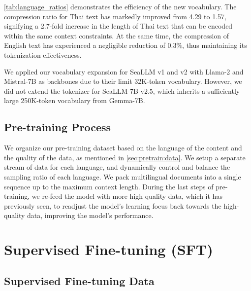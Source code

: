 \ref{tab:language_ratios} demonstrates the efficiency of the new vocabulary. The compression ratio for Thai text has markedly improved from 4.29 to 1.57, signifying a 2.7-fold increase in the length of Thai text that can be encoded within the same context constraints. At the same time, the compression of English text has experienced a negligible reduction of 0.3\%, thus maintaining its tokenization effectiveness.

We applied our vocabulary expansion for SeaLLM v1 and v2 with Llama-2 and Mistral-7B as backbones due to their limit 32K-token vocabulary. However, we did not extend the tokenizer for SeaLLM-7B-v2.5, which inherits a sufficiently large 250K-token vocabulary from Gemma-7B.

\subsection{Pre-training Process}\label{sec:pretrain:process}

We organize our pre-training dataset based on the language of the content and the quality of the data, as mentioned in \ref{sec:pretrain:data}. We setup a separate stream of data for each language, and dynamically control and balance the sampling ratio of each language. We pack multilingual documents into a single sequence up to the maximum context length. During the last steps of pre-training, we re-feed the model with more high quality data, which it has previously seen, to readjust the model's learning focus back towards the high-quality data, improving the model's performance.

\section{Supervised Fine-tuning (SFT)}\label{sec:sft}

\subsection{Supervised Fine-tuning Data}\label{sec:sft:data}

